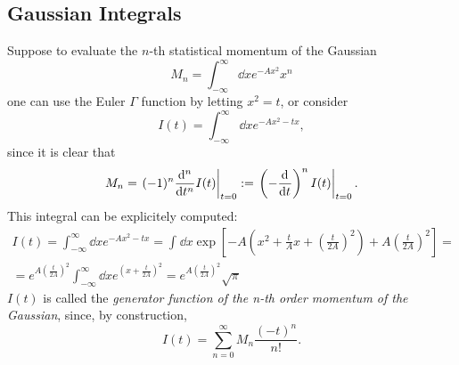 \subsection{Gaussian Integrals}
Suppose to evaluate the $n$-th statistical momentum of the Gaussian
$$M_n=\int_{-\infty}^{\infty} \dd x e^{-Ax^2}x^n$$
one can use the Euler $\Gamma$ function by letting $x^2=t$, or consider
\[
    I(t) = \int_{-\infty}^{\infty} \dd x e^{-Ax^2-tx},
\]
since it is clear that
\[
    M_n =\eval{(-1)^n \dv[n]{}{t}I(t)}_{t=0}:=\eval{\left(-\dv[]{}{t}\right)^n
    I(t)}_{t=0}.
\]
This integral can be explicitely computed:
\begin{gather*}
    I(t) = \int_{-\infty}^{\infty} \dd x e^{-Ax^2-tx} = \int_{}^{} \dd x
    \exp\left[-A\left(x^2+\frac{t}{A}x+\left(\frac{t}{2A}
    \right)^2\right) + A\left(\frac{t}{2A}\right)^2\right] =\\= 
    e^{A\left(\frac{t}{2A}\right)^2}\int_{-\infty}^{\infty} \dd xe^{\left(
    x+\frac{t}{2A}\right)^2}= e^{A\left(\frac{t}{2A}\right)^2}\sqrt{\pi}
\end{gather*}
$I(t)$ is called the \textit{generator function of the n-th order momentum of
the Gaussian}, since, by construction,
$$I(t) = \sum_{n=0}^{\infty}M_n\frac{(-t)^n}{n!}.$$
